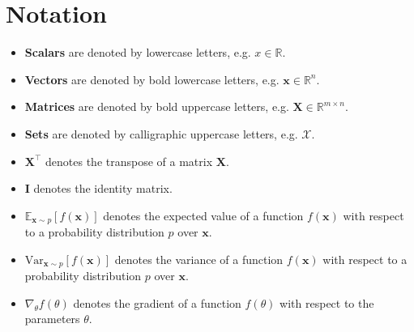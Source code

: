     \chapter*{Notation}
    \begin{itemize}
        \item \textbf{Scalars} are denoted by lowercase letters, e.g. $x\in\mathbb{R}$.
        \item \textbf{Vectors} are denoted by bold lowercase letters, e.g. $\mathbf{x}\in\mathbb{R}^n$.
        \item \textbf{Matrices} are denoted by bold uppercase letters, e.g. $\mathbf{X}\in\mathbb{R}^{m\times n}$.
        \item \textbf{Sets} are denoted by calligraphic uppercase letters, e.g. $\mathcal{X}$.
        \item $\mathbf{X}^\top$ denotes the transpose of a matrix $\mathbf{X}$.
        \item $\mathbf{I}$ denotes the identity matrix.
        \item $\mathbb{E}_{\mathbf{x}\sim p}[f(\mathbf{x})]$ denotes the expected value of a function $f(\mathbf{x})$ with respect to a probability distribution $p$ over $\mathbf{x}$.
        \item $\mathrm{Var}_{\mathbf{x}\sim p}[f(\mathbf{x})]$ denotes the variance of a function $f(\mathbf{x})$ with respect to a probability distribution $p$ over $\mathbf{x}$.
        \item $\nabla_{\theta} f(\theta)$ denotes the gradient of a function $f(\theta)$ with respect to the parameters $\theta$.   
    \end{itemize}

\endgroup
